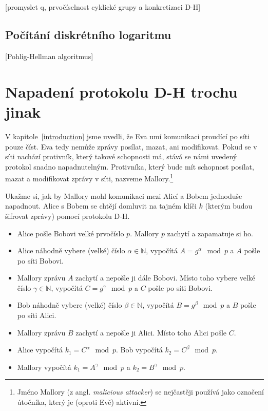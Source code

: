 \documentclass[
  program=infoi,
  biblatex,
  figures=false,
  glossaries,
  index
]{kidiplom}
\begin{document}

        \subsection{}


        [promyslet q, prvočíselnost cyklické grupy a konkretizaci D-H]


        \subsection{Počítání diskrétního logaritmu}\label{subsec:counting-discrete-log}

        [Pohlig-Hellman algoritmus]


    

\section{Napadení protokolu D-H trochu jinak}


    V kapitole~\ref{introduction} jsme uvedli, že Eva umí komunikaci proudící po síti pouze číst. Eva tedy nemůže zprávy posílat, mazat, ani modifikovat.
    Pokud se v síti nachází protivník, který takové schopnosti má, stává se námi uvedený protokol snadno napadnutelným. Protivníka, který bude mít
    schopnost posílat, mazat a modifikovat zprávy v síti, nazveme Mallory.\footnote{Jméno Mallory (z angl. \emph{malicious attacker}) se nejčastěji používá jako
    označení útočníka, který je (oproti Evě) aktivní.}

    \bigskip

    Ukažme si, jak by Mallory mohl komunikaci mezi Alicí a Bobem jednoduše napadnout.
    Alice s Bobem se chtějí domluvit na tajném klíči $k$ (kterým budou šifrovat zprávy) pomocí protokolu D-H.

        \begin{itemize}
            \item
                Alice pošle Bobovi velké prvočíslo $p$.
                Mallory $p$ zachytí a zapamatuje si ho.
            \item
                Alice náhodně vybere (velké) číslo $\alpha \in \mathbb{N}$, vypočítá $A=g^\alpha \mod{p}$ a $A$ pošle po síti Bobovi.
            \item
                Mallory zprávu $A$ zachytí a nepošle ji dále Bobovi. Místo toho vybere velké číslo $\gamma \in \mathbb{N}$,
                vypočítá $C=g^\gamma \mod{p}$ a $C$ pošle po síti Bobovi.
            \item
                Bob náhodně vybere (velké) číslo $\beta \in \mathbb{N}$, vypočítá $B=g^\beta \mod{p}$ a $B$ pošle po síti Alici.
            \item
                Mallory zprávu $B$ zachytí a nepošle ji Alici. Místo toho Alici pošle $C$.
            \item
                Alice vypočítá $k_1=C^\alpha \mod{p}$. Bob vypočítá $k_2=C^\beta \mod{p}$.
            \item
                Mallory vypočítá $k_1=A^\gamma \mod{p}$ a $k_2=B^\gamma \mod{p}$.

        \end{itemize}
\end{document}
